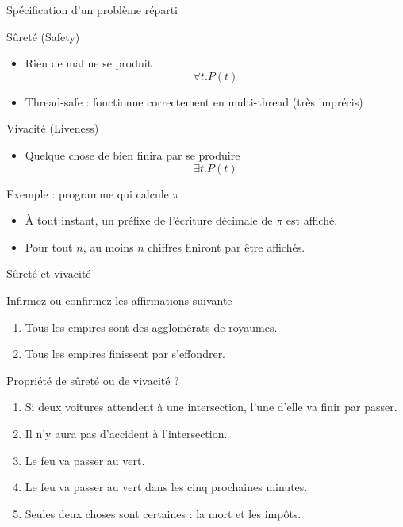 \begin{frame}{Spécification d'un problème réparti}
  \begin{block}{Sûreté (Safety)}
    \begin{itemize}
      \item Rien de mal ne se produit
      $$\forall t. P(t)$$
      \item Thread-safe : fonctionne correctement en multi-thread (très imprécis)
    \end{itemize}
  \end{block}
  \begin{block}{Vivacité (Liveness)}
    \begin{itemize}
      \item Quelque chose de bien finira par se produire
      $$\exists t. P(t)$$
    \end{itemize}
  \end{block}
  \begin{exampleblock}{Exemple : programme qui calcule $\pi$}
    \begin{itemize}
    \item[Sûreté :] \alert{À tout instant}, un préfixe
      de l'écriture décimale de $\pi$ est affiché.
    \item[Vivacité :] Pour tout $n$,
      au moins $n$ chiffres \alert{finiront par} être affichés.
    \end{itemize}
  \end{exampleblock}
\end{frame}

\begin{frame}{Sûreté et vivacité}
  \begin{alertblock}{Infirmez ou confirmez les affirmations suivante}
    \begin{enumerate}
    \item Tous les empires sont des agglomérats de royaumes.
    \item Tous les empires finissent par s'effondrer.
    \end{enumerate}
  \end{alertblock}
  \begin{alertblock}{Propriété de sûreté ou de vivacité ?}
    \begin{enumerate}
    \item Si deux voitures attendent à une intersection, l'une d'elle va finir par passer.
    \item Il n'y aura pas d'accident à l'intersection.
    \item Le feu va passer au vert.
    \item Le feu va passer au vert dans les cinq prochaines minutes.
    \item Seules deux choses sont certaines : la mort et les impôts.
    \end{enumerate}
  \end{alertblock}
\end{frame}

